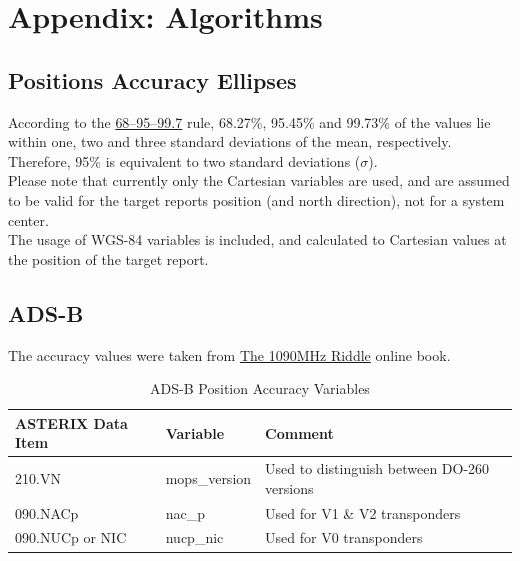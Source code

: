 \section{Appendix: Algorithms}
\label{sec:appendix_algorithms}  

\subsection{Positions Accuracy Ellipses}
\label{sec:algo_position_accuracy_ellipses} 

According to the \href{https://en.wikipedia.org/wiki/68%E2%80%9395%E2%80%9399.7_rule}{68–95–99.7} rule, 68.27\%, 95.45\% and 99.73\% of the values lie within one, two and three standard deviations of the mean, respectively. \\

Therefore, 95\% is equivalent to two standard deviations ($\sigma$). \\

Please note that currently only the Cartesian variables are used, and are assumed to be valid for the target reports position (and north direction), not for a system center. \\

The usage of WGS-84 variables is included, and calculated to Cartesian values at the position of the target report.

\subsection{ADS-B}

The accuracy values were taken from \href{https://mode-s.org/decode/adsb/uncertainty.html}{The 1090MHz Riddle} online book.

\begin{center}
 \begin{table}[H]
  \begin{tabularx}{\textwidth}{ | X | l | l | }
    \hline
    \textbf{ASTERIX Data Item} & \textbf{Variable} & \textbf{Comment} \\ \hline
    210.VN & mops\_version & Used to distinguish between DO-260 versions \\ \hline
    090.NACp & nac\_p  & Used for V1 \& V2 transponders \\ \hline
    090.NUCp or NIC & nucp\_nic  & Used for V0 transponders \\ \hline
  \end{tabularx}
  \caption{ADS-B Position Accuracy Variables}
\end{table}
\end{center}

